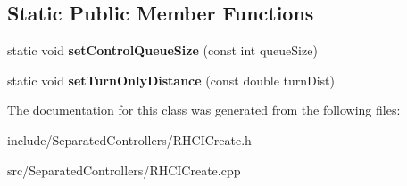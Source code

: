 \subsection*{\-Static \-Public \-Member \-Functions}
\begin{DoxyCompactItemize}
\item 
\hypertarget{class_r_h_c_i_create_a6fa2c185a82c7ec346e9a4a81f5158c3}{static void {\bfseries set\-Control\-Queue\-Size} (const int queue\-Size)}\label{class_r_h_c_i_create_a6fa2c185a82c7ec346e9a4a81f5158c3}

\item 
\hypertarget{class_r_h_c_i_create_a08e9bd17083a978c6b5cd142bca84460}{static void {\bfseries set\-Turn\-Only\-Distance} (const double turn\-Dist)}\label{class_r_h_c_i_create_a08e9bd17083a978c6b5cd142bca84460}

\end{DoxyCompactItemize}


\-The documentation for this class was generated from the following files\-:\begin{DoxyCompactItemize}
\item 
include/\-Separated\-Controllers/\-R\-H\-C\-I\-Create.\-h\item 
src/\-Separated\-Controllers/\-R\-H\-C\-I\-Create.\-cpp\end{DoxyCompactItemize}
